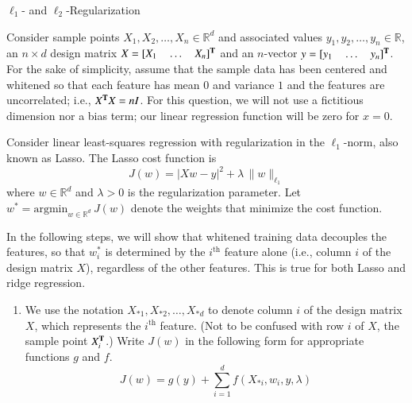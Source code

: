 \documentclass[section]{problemset}
\newcommand{\argmin}{\mathrm{argmin}}
\begin{document}
\begin{problem}{$\ell_1$- and $\ell_2$-Regularization}


Consider sample points $X_1, X_2, \ldots, X_n \in \mathbb{R}^d$ and
associated values $y_1, y_2, \ldots, y_n \in \mathbb{R}$,
an $n \times d$ design matrix $X = [X_1~~~~\dots~~~~X_n]^{\mathbf{T}}$ and
an $n$-vector $y = [y_1~~~~\dots~~~~y_n]^{\mathbf{T}}$.
For the sake of simplicity, assume that the sample data
has been centered and whitened so that
each feature has mean $0$ and variance $1$ and the features are uncorrelated;
i.e., $X^{\mathbf{T}} X = nI$.
For this question, we will not use a fictitious dimension nor a bias term;
our linear regression function will be zero for $x = 0$.

Consider linear least-squares regression with
regularization in the $\ell_1$-norm, also known as Lasso.
The Lasso cost function is
\[
J(w) = |Xw - y|^2 +\lambda \, \|w\|_{\ell_1}
\]
where $w \in \mathbb{R}^d$ and $\lambda > 0$ is the regularization parameter.
Let $w^* = \argmin_{w \in \mathbb{R}^d} \, J(w)$ denote
the weights that minimize the cost function.

In the following steps, we will show that whitened training data decouples the features, so that $w^*_i$ is determined by the $i^\mathrm{th}$ feature alone (i.e., column $i$ of the design matrix $X$), regardless of the other features.  This is true for both Lasso and ridge regression.

\begin{enumerate}
\item
We use the notation $X_{*1}, X_{*2}, \ldots, X_{*d}$ to denote column $i$ of the design matrix $X$, which represents the $i^\mathrm{th}$ feature.
(Not to be confused with row $i$ of $X$, the sample point $X_i^{\mathbf{T}}$.)
Write $J(w)$ in the following form for appropriate functions $g$ and $f$.
\[
J(w) = g(y) + \sum_{i=1}^d f(X_{*i}, w_i, y, \lambda)
\]


\end{enumerate}
\end{problem}
\end{document}
